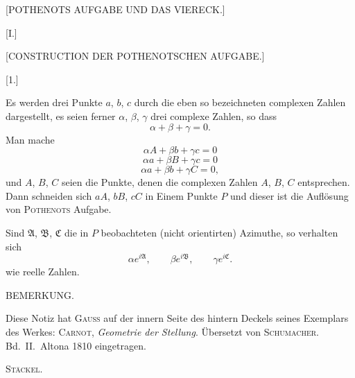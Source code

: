 \clearpage{}

\begin{center}
[POTHENOTS AUFGABE UND DAS VIERECK.]
\end{center}

\begin{center}
[I.]

[CONSTRUCTION DER POTHENOTSCHEN AUFGABE.]

[1.]
\end{center}

Es werden drei Punkte $a$, $b$, $c$ durch die eben so bezeichneten complexen
Zahlen dargestellt, es seien ferner $\alpha$, $\beta$, $\gamma$ drei complexe
Zahlen, so dass
\[
\alpha+\beta+\gamma=0.
\]
Man mache
\[
\alpha A+\beta b+\gamma c=0
\]
\[
\alpha a+\beta B+\gamma c=0
\]
\[
\alpha a+\beta b+\gamma C=0,
\]
und $A$, $B$, $C$ seien die Punkte, denen die complexen Zahlen
$A$, $B$, $C$ entsprechen. Dann schneiden sich $aA$,
$bB$, $cC$ in Einem Punkte $P$ und dieser ist die Auflösung
von \textsc{Pothenots} Aufgabe.

Sind $\mathfrak{A}$, $\mathfrak{B}$, $\mathfrak{C}$ die in $P$ beobachteten
(nicht orientirten) Azimuthe, so verhalten sich
\[
\alpha e^{i\mathfrak{A}}, \qquad \beta e^{i\mathfrak{B}}, \qquad \gamma e^{i\mathfrak{C}}.
\]
wie reelle Zahlen.

\begin{center}
BEMERKUNG.
\end{center}

Diese Notiz hat \textsc{Gauss} auf der innern Seite des hintern Deckels
seines Exemplars des Werkes: \textsc{Carnot}, \emph{Geometrie der
Stellung}. Übersetzt von \textsc{Schumacher}. Bd.\ II.\ Altona 1810
eingetragen.

\par\hfill\textsc{Stäckel}.\par
